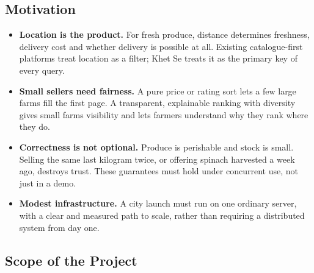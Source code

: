 \documentclass[manuscript,screen,review]{acmart}
\begin{document}
\subsection{Motivation}

\begin{itemize}
  \item \textbf{Location is the product.} For fresh produce, distance determines freshness, delivery cost and whether delivery is possible at all. Existing catalogue-first platforms treat location as a filter; Khet Se treats it as the primary key of every query.
  \item \textbf{Small sellers need fairness.} A pure price or rating sort lets a few large farms fill the first page. A transparent, explainable ranking with diversity gives small farms visibility and lets farmers understand why they rank where they do.
  \item \textbf{Correctness is not optional.} Produce is perishable and stock is small. Selling the same last kilogram twice, or offering spinach harvested a week ago, destroys trust. These guarantees must hold under concurrent use, not just in a demo.
  \item \textbf{Modest infrastructure.} A city launch must run on one ordinary server, with a clear and measured path to scale, rather than requiring a distributed system from day one.
\end{itemize}

\subsection{Scope of the Project}
\end{document}
